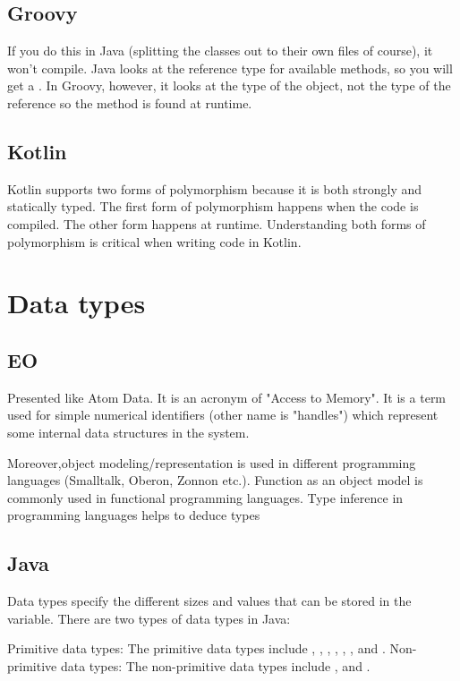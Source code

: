 \documentclass[12pt]{book}
\begin{document}
{{\subsection{Groovy}
If you do this in Java (splitting the classes out to their own files of course), it won't compile. Java looks at the reference type for available methods, so you will get a . In Groovy, however, it looks at the type of the object, not the type of the reference so the method is found at runtime.

\subsection{Kotlin}
Kotlin supports two forms of polymorphism because it is both strongly and statically typed. The first form of polymorphism happens when the code is compiled. The other form happens at runtime. Understanding both forms of polymorphism is critical when writing code in Kotlin.

\section{Data types}

\subsection{EO}
Presented like Atom Data. It is an acronym of "Access to Memory". It is a term used for simple numerical identifiers (other name is "handles") which represent some internal data structures in the system.

Moreover,object modeling/representation is used in different programming languages (Smalltalk, Oberon, Zonnon etc.). Function as an object model is commonly used in functional programming languages. Type inference in programming languages helps to deduce types

\subsection{Java}
Data types specify the different sizes and values that can be stored in the variable.  There are two types of data types in Java:

Primitive data types: The primitive data types include , , , , , ,  and . Non-primitive data types: The non-primitive data types include ,  and .

}}
\end{document}

